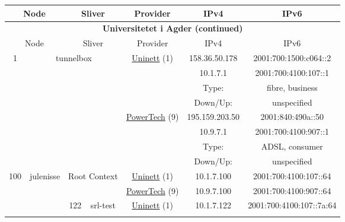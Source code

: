 \begin{small}
\begin{center}
\begin{longtable}{|c|c|c|c|c|c|c|c|}
 \multicolumn{2}{|p{8em}|}{Node} & \multicolumn{2}{|p{8em}|}{Sliver} & \multicolumn{2}{|p{8em}|}{Provider} & IPv4 & IPv6 \\ \hline
\endfirsthead
\hline
 \multicolumn{8}{|c|}{\textbf{Universitetet i Agder (continued)}} \\ \hline
 \multicolumn{2}{|p{8em}|}{Node} & \multicolumn{2}{|p{8em}|}{Sliver} & \multicolumn{2}{|p{8em}|}{Provider} & IPv4 & IPv6 \\ \hline
\endhead
 \multirow{8}{*}{\tiny{1}} & \multicolumn{3}{|c|}{\multirow{8}{*}{\tiny{tunnelbox}}} & \multicolumn{2}{|c|}{\multirow{4}{*}{\tiny{\href{https://www.uninett.no}{Uninett} (1)}}} & \tiny{158.36.50.178} & \tiny{2001:700:1500:c064::2} \\* \cline{7-7}\cline{8-8}
  & \multicolumn{3}{|c|}{} & \multicolumn{2}{|c|}{} & \tiny{10.1.7.1} & \tiny{2001:700:4100:107::1} \\* \cline{7-7}\cline{8-8}
  & \multicolumn{3}{|c|}{} & \multicolumn{2}{|c|}{} & Type: & fibre, business \\* \cline{7-7}\cline{8-8}
  & \multicolumn{3}{|c|}{} & \multicolumn{2}{|c|}{} & Down/Up:  & unspecified \\* \cline{5-5}\cline{6-6}\cline{7-7}\cline{8-8}
  & \multicolumn{3}{|c|}{} & \multicolumn{2}{|c|}{\multirow{4}{*}{\tiny{\href{http://www.powertech.no}{PowerTech} (9)}}} & \tiny{195.159.203.50} & \tiny{2001:840:490a::50} \\* \cline{7-7}\cline{8-8}
  & \multicolumn{3}{|c|}{} & \multicolumn{2}{|c|}{} & \tiny{10.9.7.1} & \tiny{2001:700:4100:907::1} \\* \cline{7-7}\cline{8-8}
  & \multicolumn{3}{|c|}{} & \multicolumn{2}{|c|}{} & Type: & ADSL, consumer \\* \cline{7-7}\cline{8-8}
  & \multicolumn{3}{|c|}{} & \multicolumn{2}{|c|}{} & Down/Up:  & unspecified \\ \hline
 \multirow{18}{*}{\tiny{100}} & \multicolumn{1}{|l|}{\multirow{18}{*}{\tiny{julenisse}}} & \multicolumn{2}{|c|}{\multirow{2}{*}{\tiny{Root Context}}} & \multicolumn{2}{|c|}{\tiny{\href{https://www.uninett.no}{Uninett} (1)}} & \tiny{10.1.7.100} & \tiny{2001:700:4100:107::64} \\* \cline{5-5}\cline{6-6}\cline{7-7}\cline{8-8}
  &  & \multicolumn{2}{|c|}{} & \multicolumn{2}{|c|}{\tiny{\href{http://www.powertech.no}{PowerTech} (9)}} & \tiny{10.9.7.100} & \tiny{2001:700:4100:907::64} \\* \cline{3-3}\cline{4-4}\cline{5-5}\cline{6-6}\cline{7-7}\cline{8-8}
  &  & \multirow{2}{*}{\tiny{122}} & \multicolumn{1}{|l|}{\multirow{2}{*}{\tiny{srl-test}}} & \multicolumn{2}{|c|}{\tiny{\href{https://www.uninett.no}{Uninett} (1)}} & \tiny{10.1.7.122} & \tiny{2001:700:4100:107::7a:64} \\* \cline{5-5}\cline{6-6}\cline{7-7}\cline{8-8}

\end{longtable}
\end{center}
\end{small}
